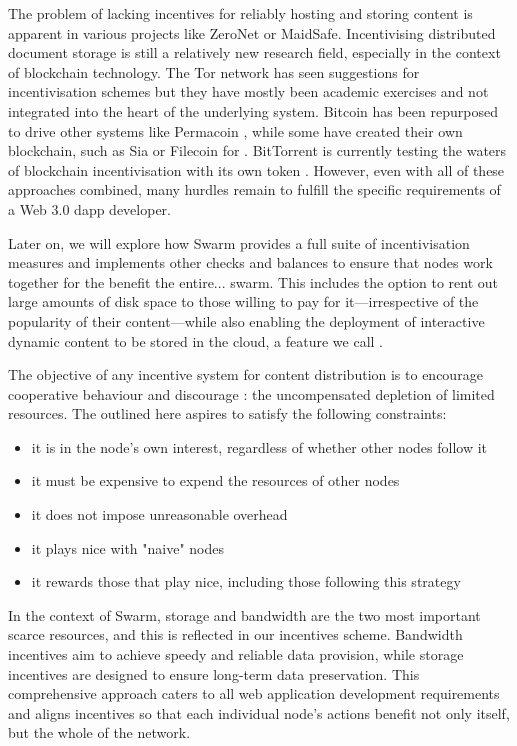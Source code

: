 The problem of lacking incentives for reliably hosting and storing content is apparent in various projects like ZeroNet or MaidSafe. Incentivising distributed document storage is still a relatively new research field, especially in the context of blockchain technology. The Tor network has seen suggestions for incentivisation schemes \cite{jansen2014onions,ghoshetal2014tor} but they have mostly been academic exercises and not integrated into the heart of the underlying system. Bitcoin has been repurposed to drive other systems like Permacoin \cite{miller2014permacoin}, while some have created their own blockchain, such as Sia \cite{vorick2014sia} or Filecoin \cite{filecoin2014} for . BitTorrent is currently testing the waters of blockchain incentivisation with its own token \cite{tron2018,bittorrent2019}. However, even with all of these approaches combined, many hurdles remain to fulfill the specific requirements of a Web 3.0 dapp developer.

Later on, we will explore how Swarm provides a full suite of incentivisation measures and implements other checks and balances to ensure that nodes work together for the benefit the entire... swarm. This includes the option to rent out large amounts of disk space to those willing to pay for it—irrespective of the popularity of their content—while also enabling the deployment of interactive dynamic content to be stored in the cloud, a feature we call .

The objective of any incentive system for  content distribution is to encourage cooperative behaviour and discourage : the uncompensated depletion of limited resources. The  outlined here aspires to satisfy the following constraints:

\begin{itemize}
    \item it is in the node's own interest, regardless of whether other nodes follow it
    \item it must be expensive to expend the resources of other nodes
    \item it does not impose unreasonable overhead
    \item it plays nice with "naive" nodes
    \item it rewards those that play nice, including those following this strategy
\end{itemize}

In the context of Swarm, storage and bandwidth are the two most important scarce resources, and this is reflected in our incentives scheme. Bandwidth incentives aim to achieve speedy and reliable data provision, while storage incentives are designed to ensure long-term data preservation. This comprehensive approach caters to all web application development requirements and aligns incentives so that each individual node's actions benefit not only itself, but the whole of the network. 

